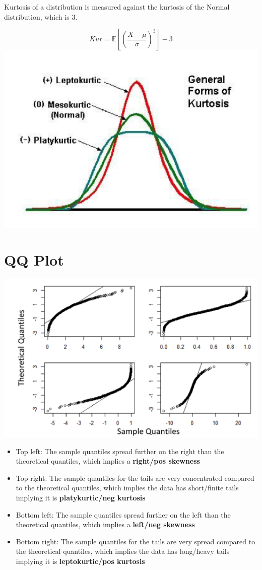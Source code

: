 \documentclass[
  oneside]{book}
\providecommand{\tightlist}{%
  \setlength{\itemsep}{0pt}\setlength{\parskip}{0pt}}
\begin{document}
Kurtosis of a distribution is measured against the kurtosis of the Normal distribution, which is \(3\).

\[
Kur = \mathbb{E}\left[ \left( \frac{X-\mu}{\sigma} \right)^{3} \right] - 3
\]
\includegraphics{Notes/Obsidian-Attachments/2-Return-Distributions-1.png}

\hypertarget{qq-plot}{%
\section{QQ Plot}\label{qq-plot}}

\includegraphics{Notes/Obsidian-Attachments/2-Return-Distributions-2.png}

\begin{itemize}
\tightlist
\item
  Top left: The sample quantiles spread further on the right than the theoretical quantiles, which implies a \textbf{right/pos skewness}
\item
  Top right: The sample quantiles for the tails are very concentrated compared to the theoretical quantiles, which implies the data has short/finite tails implying it is \textbf{platykurtic/neg kurtosis}
\item
  Bottom left: The sample quantiles spread further on the left than the theoretical quantiles, which implies a \textbf{left/neg skewness}
\item
  Bottom right: The sample quantiles for the tails are very spread compared to the theoretical quantiles, which implies the data has long/heavy tails implying it is \textbf{leptokurtic/pos kurtosis}
\end{itemize}
\end{document}
